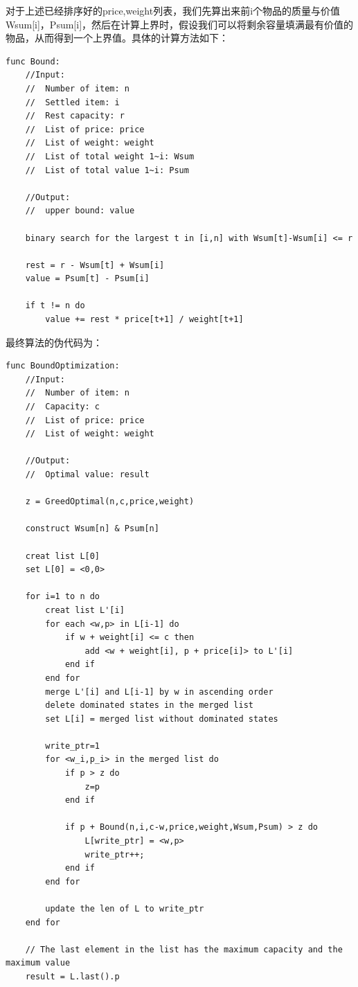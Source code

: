 \documentclass[openany]{book}
\begin{document}
对于上述已经排序好的price,weight列表，我们先算出来前i个物品的质量与价值Wsum[i]，Psum[i]，然后在计算上界时，假设我们可以将剩余容量填满最有价值的物品，从而得到一个上界值。具体的计算方法如下：
\begin{lstlisting}
func Bound:
    //Input: 
    //  Number of item: n
    //  Settled item: i
    //  Rest capacity: r
    //  List of price: price
    //  List of weight: weight 
    //  List of total weight 1~i: Wsum
    //  List of total value 1~i: Psum

    //Output:
    //  upper bound: value

    binary search for the largest t in [i,n] with Wsum[t]-Wsum[i] <= r

    rest = r - Wsum[t] + Wsum[i]
    value = Psum[t] - Psum[i]

    if t != n do
        value += rest * price[t+1] / weight[t+1]
\end{lstlisting}

最终算法的伪代码为：
\begin{lstlisting}
func BoundOptimization:
    //Input: 
    //  Number of item: n
    //  Capacity: c
    //  List of price: price
    //  List of weight: weight 

    //Output:
    //  Optimal value: result

    z = GreedOptimal(n,c,price,weight)

    construct Wsum[n] & Psum[n]

    creat list L[0]
    set L[0] = <0,0>

    for i=1 to n do
        creat list L'[i]
        for each <w,p> in L[i-1] do
            if w + weight[i] <= c then
                add <w + weight[i], p + price[i]> to L'[i]
            end if
        end for
        merge L'[i] and L[i-1] by w in ascending order
        delete dominated states in the merged list
        set L[i] = merged list without dominated states

        write_ptr=1
        for <w_i,p_i> in the merged list do
            if p > z do
                z=p
            end if

            if p + Bound(n,i,c-w,price,weight,Wsum,Psum) > z do
                L[write_ptr] = <w,p>
                write_ptr++;
            end if
        end for

        update the len of L to write_ptr
    end for

    // The last element in the list has the maximum capacity and the maximum value
    result = L.last().p  

\end{lstlisting}
\end{document}
